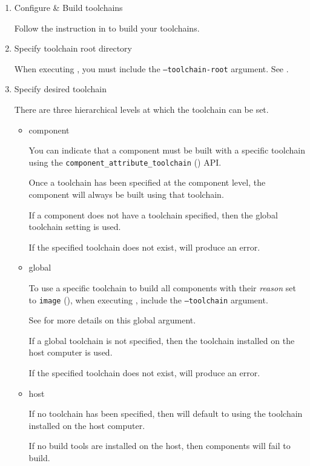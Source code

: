 \begin{enumerate}
\item Configure \& Build toolchains

  Follow the instruction in  to
  build your toolchains.

\item Specify toolchain root directory

  When executing \lmsbw, you must include the
  \texttt{--toolchain-root} argument.  See
  .

\item Specify desired toolchain

  There are three hierarchical levels at which the toolchain can be set.

  \begin{itemize}
  \item component

    You can indicate that a component must be built with a specific
    toolchain using the \texttt{component\_attribute\_toolchain}
    () API.

    Once a toolchain has been specified at the component level, the
    component will always be built using that toolchain.

    If a component does not have a toolchain specified, then the
    global toolchain setting is used.

    If the specified toolchain does not exist, \lmsbw will produce an
    error.

  \item global

    To use a specific toolchain to build all components with their
    \emph{reason} set to \texttt{image} (),
    when executing \lmsbw, include the \texttt{--toolchain} argument.

    See  for more details on this global
    argument.

    If a global toolchain is not specified, then the toolchain
    installed on the host computer is used.

    If the specified toolchain does not exist, \lmsbw will produce an
    error.

  \item host

    If no toolchain has been specified, then \lmsbw will default to
    using the toolchain installed on the host computer.

    If no build tools are installed on the host, then components will
    fail to build.

  \end{itemize}

\end{enumerate}

